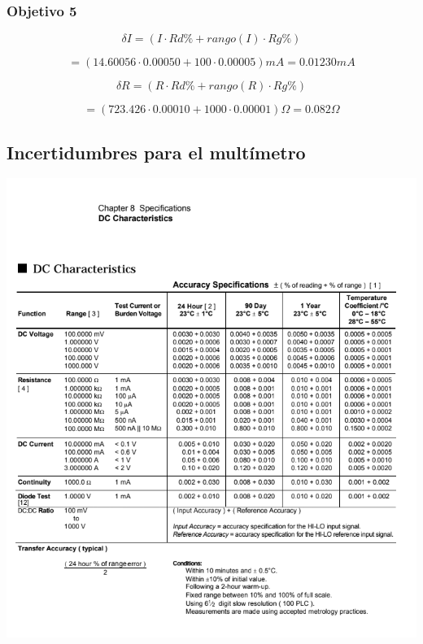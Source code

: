 \documentclass[DIV=calc, paper=a4, fontsize=11pt]{scrartcl}
\newenvironment{Figura}
  {\par\medskip\noindent\minipage{\linewidth}}
  {\endminipage\par\medskip}
\begin{document}
\begin{multicols}{2}
\subsubsection*{Objetivo 5}

\begin{equation*}
    \delta I = (I \cdot Rd\% + rango(I) \cdot Rg\%) 
\end{equation*}

\begin{equation*}
    = (14.60056 \cdot 0.00050 + 100 \cdot 0.00005 ) mA = 0.01230 mA
\end{equation*}

\begin{equation*}
    \delta R = (R \cdot Rd\% + rango(R) \cdot Rg\%) 
\end{equation*}

\begin{equation*}
    = (723.426 \cdot 0.00010 + 1000 \cdot 0.00001 ) \Omega = 0.082 \Omega
\end{equation*}





\end{multicols}



\subsection*{Incertidumbres para el multímetro}

\begin{Figura}
    \centering
    \includegraphics[width=1\textwidth]{incertidumbres multimetro.PNG}
    \label{fig}
\end{Figura}
\end{document}
